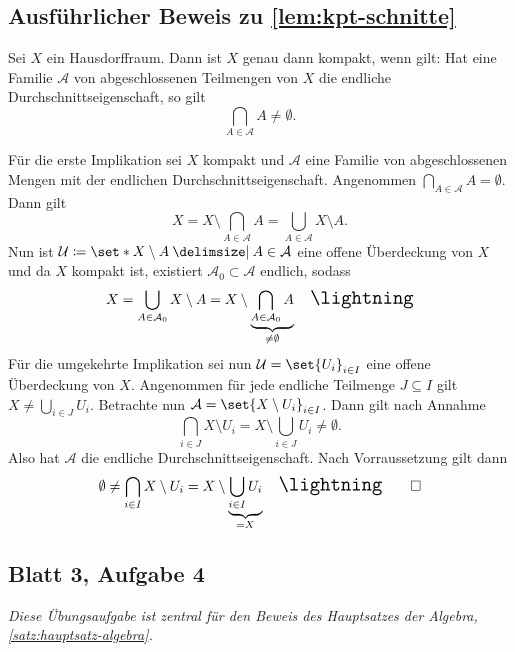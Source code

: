
\subsection{Ausführlicher Beweis zu \cref{lem:kpt-schnitte}} %
\label{sub:kpt-schnitte}
Sei $X$ ein Hausdorffraum. Dann ist $X$ genau dann kompakt, wenn gilt: Hat eine Familie $\mathcal{A}$ von abgeschlossenen Teilmengen von $X$ die endliche 
Durchschnittseigenschaft, so gilt 
\[
	\bigcap_{A \in \mathcal{A}} A \not= \emptyset.
\]
\begin{beweis}
	Für die erste Implikation sei $X$ kompakt und $\mathcal{A}$ eine Familie von abgeschlossenen Mengen mit der endlichen Durchschnittseigenschaft.
	Angenommen $\bigcap_{A \in \mathcal{A}} A = \emptyset$.
	Dann gilt
	\[
		X = X \setminus \bigcap_{A \in \mathcal{A}} A = \bigcup_{A \in \mathcal{A}} X \setminus A.
	\]
	Nun ist $\mathcal{U} \coloneqq \set*{X \setminus A \given A \in \mathcal{A}}$ eine offene Überdeckung von $X$ und da $X$ kompakt ist, existiert $\mathcal{A}_0 \subset \mathcal{A}$ endlich, sodass
	\[
		X = \bigcup_{A \in \mathcal{A}_0} X \setminus A = X \setminus \underbrace{\bigcap_{A \in \mathcal{A}_0 } A }_{\neq \emptyset} \quad \light
	\]
	Für die umgekehrte Implikation sei nun $\mathcal{U} = \set{U_i}_{i \in I}$ eine offene Überdeckung von $X$.
	Angenommen für jede endliche Teilmenge $J \subseteq I$ gilt $X \neq \bigcup_{i \in J} U_i$.
	Betrachte nun $\mathcal{A} =  \set{X \setminus U_i}_{i \in I}$. Dann gilt nach Annahme
	\[
		\bigcap_{i \in J} X \setminus U_i = X \setminus \bigcup_{i \in J} U_i \neq \emptyset.
	\]
	Also hat $\mathcal{A}$ die endliche Durchschnittseigenschaft. Nach Vorraussetzung gilt dann
	\[
		\emptyset \not= \bigcap_{i \in I} X \setminus U_i = X \setminus \underbrace{\bigcup_{i \in I} U_i}_{= X} \quad \light \qedhere
	\]
\end{beweis}


\subsection[Blatt3, Aufgabe 4: Hilfssatz für den Hauptsatz der Algebra]{Blatt 3, Aufgabe 4} %
\label{sub:B3A4}
\emph{Diese Übungsaufgabe ist zentral für den Beweis des Hauptsatzes der Algebra, \cref{satz:hauptsatz-algebra}.} 

